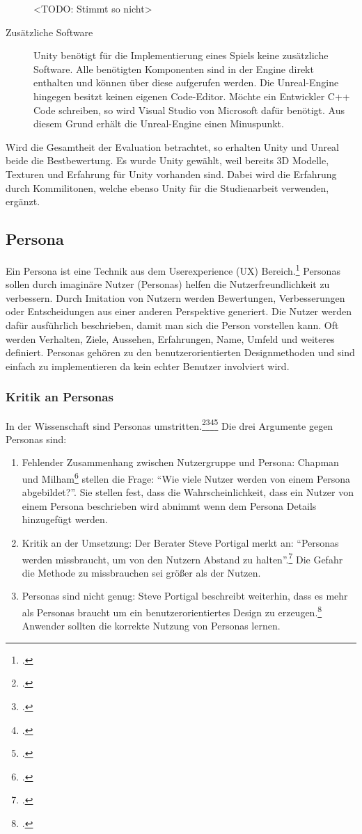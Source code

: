 \begin{description}
		<TODO: Stimmt so nicht>
		\item[Zusätzliche Software]{Unity benötigt für die Implementierung eines Spiels keine zusätzliche Software. Alle benötigten Komponenten sind in der Engine direkt enthalten und können über diese aufgerufen werden. Die Unreal-Engine hingegen besitzt keinen eigenen Code-Editor. Möchte ein Entwickler C++ Code schreiben, so wird Visual Studio von Microsoft dafür benötigt. Aus diesem Grund erhält die Unreal-Engine einen Minuspunkt.}
	\end{description}
	Wird die Gesamtheit der Evaluation betrachtet, so erhalten Unity und Unreal beide die Bestbewertung. Es wurde Unity gewählt, weil bereits 3D Modelle, Texturen und Erfahrung für Unity vorhanden sind. Dabei wird die Erfahrung durch Kommilitonen, welche ebenso Unity für die Studienarbeit verwenden, ergänzt.

\subsection{Persona}\label{ssec:persona}
	Ein Persona ist eine Technik aus dem Userexperience (UX) Bereich.\footcite{persona} Personas sollen durch imaginäre Nutzer (Personas) helfen die Nutzerfreundlichkeit zu verbessern. Durch Imitation von Nutzern werden Bewertungen, Verbesserungen oder Entscheidungen aus einer anderen Perspektive generiert. Die Nutzer werden dafür ausführlich beschrieben, damit man sich die Person vorstellen kann. Oft werden Verhalten, Ziele, Aussehen, Erfahrungen, Name, Umfeld und weiteres definiert.
	Personas gehören zu den benutzerorientierten Designmethoden und sind einfach zu implementieren da kein echter Benutzer involviert wird.
	\subsubsection{Kritik an Personas}
		In der Wissenschaft sind Personas umstritten.\footcite{persona-crit}\footcite{persona-crit2}\footcite{persona-crit3}\footcite{persona-crit4} Die drei Argumente gegen Personas sind:
		\begin{enumerate}\obeylines
			\item{ Fehlender Zusammenhang zwischen Nutzergruppe und Persona: Chapman und Milham\footcite{persona-crit} stellen die Frage: \enquote{Wie viele Nutzer werden von einem Persona abgebildet?}. Sie stellen fest, dass die Wahrscheinlichkeit, dass ein Nutzer von einem Persona beschrieben wird abnimmt wenn dem Persona Details hinzugefügt werden. }
			\item{ Kritik an der Umsetzung: Der Berater Steve Portigal merkt an: \enquote{Personas werden missbraucht, um von den Nutzern Abstand zu halten}.\footcite[Übersetzt aus dem Orginal: \enquote{Personas are misused to maintain a “safe” distance from the people we design for [\dots]}]{persona-crit4}
			Die Gefahr die Methode zu missbrauchen sei größer als der Nutzen. }
			\item{ Personas sind nicht genug: Steve Portigal beschreibt weiterhin, dass es mehr als Personas braucht um ein benutzerorientiertes Design zu erzeugen.\footcite[Seite 4, links]{persona-crit4} Anwender sollten die korrekte Nutzung von Personas lernen. }
		\end{enumerate}

